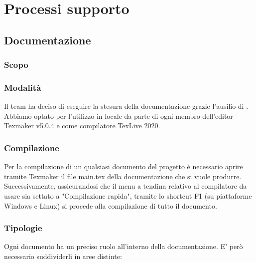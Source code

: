 \section{Processi supporto}
\subsection{Documentazione}
\subsubsection{Scopo}
\subsubsection{Modalità}
Il team ha deciso di eseguire la stesura della documentazione grazie l'ausilio di \latex. Abbiamo optato per l'utilizzo in locale da parte di ogni membro dell'editor Texmaker v5.0.4 e come compilatore TexLive 2020.
\subsubsection{Compilazione}
Per la compilazione di un qualsiasi documento del progetto è necessario aprire tramite Texmaker il file main.tex della documentazione che si vuole produrre. Successivamente, assicurandosi che il menu a tendina relativo al compilatore da usare sia settato a "Compilazione rapida", tramite lo shortcut F1 (su piattaforme Windows e Linux) si procede alla compilazione di tutto il documento.
\subsubsection{Tipologie}
Ogni documento ha un preciso ruolo all'interno della documentazione. E' però necessario suddividerli in aree distinte:
